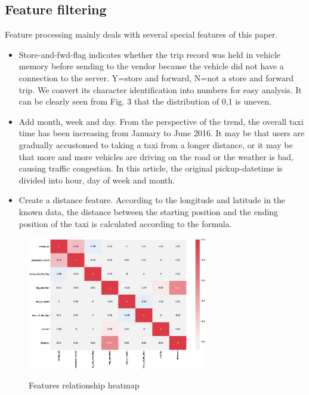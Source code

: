 \subsection{Feature filtering}
Feature processing mainly deals with several special features of this paper.
\begin{itemize}
    \item  
   Store-and-fwd-flag indicates whether the trip record was held in vehicle memory before sending to the vendor because the vehicle did not have a connection to the server. Y=store and forward, N=not a store and forward trip. We convert its character identification into numbers for easy analysis. It can be clearly seen from Fig. 3 that the distribution of 0,1 is uneven.
    \item 
   Add month, week and day. From the perspective of the trend, the overall taxi time has been increasing from January to June 2016. It may be that users are gradually accustomed to taking a taxi from a longer distance, or it may be that more and more vehicles are driving on the road or the weather is bad, causing traffic congestion. In this article, the original pickup-datetime is divided into hour, day of week and month.
    \item 
   Create a distance feature. According to the longitude and latitude in the known data, the distance between the starting position and the ending position of the taxi is calculated according to the formula.
   \end{itemize}



\begin{figure}
  \centering
   \includegraphics[width=0.7\textwidth]{figure//fig-6.eps}\\
  \caption{Features relationship heatmap}\label{fig:demical}
\end{figure}


